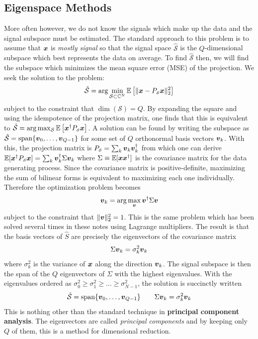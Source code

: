 \documentclass[twocolumn]{gwclass}
\newcommand{\C}{\mathbb{C}}
\begin{document}
\subsection{Eigenspace Methods}
More often however, we do not know the signals which make up the data and the signal subspace must be estimated. The standard approach to this problem is to assume that $\boldsymbol{x}$ is \emph{mostly signal} so that the signal space $\hat{\mathcal{S}}$ is the $Q$-dimensional subspace which best represents the data on average. To find $\hat{\mathcal{S}}$ then, we will find the subspace which minimizes the mean square error (MSE) of the projection. We seek the solution to the problem:
$$ \hat{\mathcal{S}} = \arg\min_{\mathcal{S}\subset\C^N} \mathbb{E}\left[\|\*x - P_{\scriptscriptstyle\mathcal{S}}\*x\|_2^2\right]$$
subject to the constraint that $\dim(\mathcal{S})=Q$. By expanding the square and using the idempotence of the projection matrix, one finds that this is equivalent to $ \hat{\mathcal{S}}=\arg\max_\mathcal{S} \mathbb{E}\left[\boldsymbol{x}^\dagger P_{\scriptscriptstyle\mathcal{S}}\boldsymbol{x} \right] $.
A solution can be found by writing the subspace as $\hat{\mathcal{S}}=\text{\normalfont{span}}\{\boldsymbol{v}_0,\dots,\boldsymbol{v}_{Q-1}\}$ for some set of $Q$ orthonormal basis vectors $\boldsymbol{v}_k$. With this, the projection matrix is $P_{\scriptscriptstyle\hat{\mathcal{S}}}=\sum_k \boldsymbol{v}_k\boldsymbol{v}_k^\dagger$ from which one can derive $\mathbb{E}[\boldsymbol{x}^\dagger P_{\scriptscriptstyle\mathcal{S}}\boldsymbol{x}] = \sum_k\boldsymbol{v}_k^\dagger \Sigma\boldsymbol{v}_k$ where $\Sigma\equiv\mathbb{E}[\boldsymbol{x}\boldsymbol{x}^\dagger]$ is the covariance matrix for the data generating process. Since the covariance matrix is positive-definite, maximizing the sum of bilinear forms is equivalent to maximizing each one individually. Therefore the optimization problem becomes
$$ \boldsymbol{v}_k = \arg\max_{\boldsymbol{v}} \boldsymbol{v}^\dagger \Sigma\boldsymbol{v}  $$
subject to the constraint that $\|\boldsymbol{v}\|_2^2=1$. This is the same problem which has been solved several times in these notes using Lagrange multipliers. The result is that the basis vectors of $\hat{S}$ are precisely the eigenvectors of the covariance matrix
$$ \Sigma\boldsymbol{v}_k  = \sigma_k^2 \boldsymbol{v}_k$$
where $\sigma_k^2$ is the variance of $\boldsymbol{x}$ along the direction $\boldsymbol{v}_k$. The signal subspace is then the span of the $Q$ eigenvectors of $\Sigma$ with the highest eigenvalues. With the eigenvalues ordered as $\sigma_0^2 \geq \sigma_1^2 \geq \dots \geq \sigma_{N-1}^2$, the solution is succinctly written
$$ \hat{\mathcal{S}} = \text{\normalfont{span}}\{\boldsymbol{v}_0,\dots,\boldsymbol{v}_{Q-1}\} \quad\quad\Sigma\boldsymbol{v}_k=\sigma_k^2\boldsymbol{v}_k $$ 
This is nothing other than the standard technique in \textbf{principal component analysis}. The eigenvectors are called \emph{principal components} and by keeping only $Q$ of them, this is a method for dimensional reduction.
\end{document}
